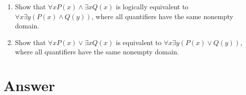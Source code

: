 \documentclass{../../cls/sig-alternate-05-2015}
\begin{document}
\begin{enumerate}
\item Show that $\forall x P(x) \wedge \exists x Q(x)$ is logically equivalent
to $\forall x \exists y (P(x) \wedge Q(y))$, where all quantifiers have
the same nonempty domain.

\item Show that $\forall xP(x) \vee \exists x Q(x)$ is equivalent to $\forall x \exists y
(P(x) \vee Q(y))$, where all quantifiers have the same
nonempty domain.
\end{enumerate}

\nocite{*}

 
\newpage
\appendix
\section{Answer}
\end{document}
